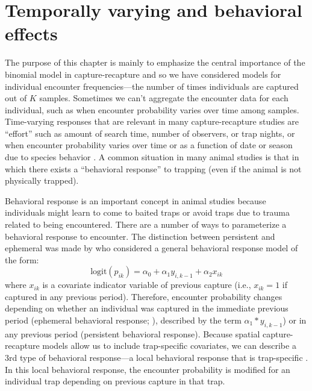 \section{Temporally varying and behavioral effects}

The purpose of this chapter is mainly to emphasize the central
importance of the binomial model in capture-recapture and so we have
considered models for individual encounter frequencies---the number of
times individuals are captured out of $K$ samples.  Sometimes we can't
aggregate the encounter data for each individual, such as when
encounter probability varies over time among samples.  Time-varying
responses that are relevant in many capture-recapture studies are
``effort'' such as amount of search time, number of observers, or trap
nights, or when encounter probability varies over time or as a
function of date or season due to species behavior
\citep{kery_etal:2010}.  A common situation in many animal studies is
that in which there exists a ``behavioral response'' to trapping (even
if the animal is not physically trapped).

Behavioral response is an important concept in animal studies
because individuals might learn to come to baited traps or avoid traps
due to trauma related to being encountered.  There are a number of
ways to parameterize a behavioral response to encounter. The
distinction between persistent and ephemeral was made by
\citet{yang_chao:2005} who considered a general behavioral response
model of the form:
\[
\mbox{logit}(p_{ik}) = \alpha_{0} + \alpha_{1} y_{i,k-1} + \alpha_{2} x_{ik}
\]
where $x_{ik}$ is a covariate indicator variable of previous capture
(i.e., $x_{ik} = 1$ if captured in any previous period). Therefore,
encounter probability changes depending on whether an individual was
captured in the immediate previous period (ephemeral behavioral
response; \citep{yang_chao:2005}), described by the term
$\alpha_{1}*y_{i,k-1}$) or in any previous period (persistent behavioral
response).
Because spatial capture-recapture models allow us to include
trap-specific covariates, we can describe a 3rd type of behavioral
response---a local behavioral response that is trap-specific
\citep{royle_etal:2011jwm}. In this local behavioral response, the
encounter probability is modified for an individual trap depending on
previous capture in that trap.


